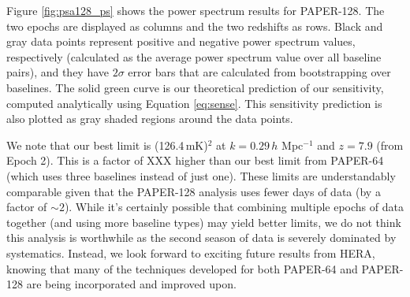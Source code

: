 Figure \ref{fig:psa128_ps} shows the power spectrum results for PAPER-128. The two epochs are displayed as columns and the two redshifts as rows. Black and gray data points represent positive and negative power spectrum values, respectively (calculated as the average power spectrum value over all baseline pairs), and they have $2\sigma$ error bars that are calculated from bootstrapping over baselines. The solid green curve is our theoretical prediction of our sensitivity, computed analytically using Equation \eqref{eq:sense}. This sensitivity prediction is also plotted as gray shaded regions around the data points.

We note that our best limit is (126.4\,mK)$^{2}$ at $k = 0.29\,h$ Mpc$^{-1}$ and $z=7.9$ (from Epoch 2). This is a factor of XXX higher than our best limit from PAPER-64 (which uses three baselines instead of just one). These limits are understandably comparable given that the PAPER-128 analysis uses fewer days of data (by a factor of $\sim2$). While it's certainly possible that combining multiple epochs of data together (and using more baseline types) may yield better limits, we do not think this analysis is worthwhile as the second season of data is severely dominated by systematics. Instead, we look forward to exciting future results from HERA, knowing that many of the techniques developed for both PAPER-64 and PAPER-128 are being incorporated and improved upon.

